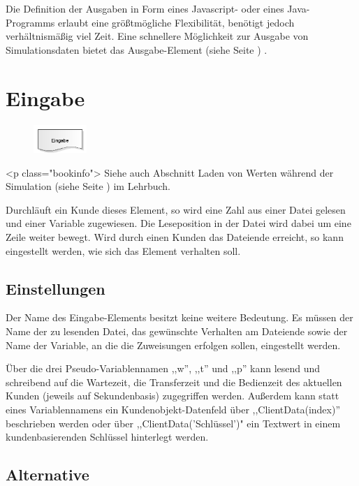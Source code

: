 Die Definition der Ausgaben in Form eines Javascript- oder eines Java-Programms erlaubt eine größtmögliche Flexibilität,
benötigt jedoch verhältnismäßig viel Zeit. Eine schnellere Möglichkeit zur Ausgabe von Simulationsdaten
bietet das Ausgabe-Element (siehe Seite \pageref{ref:ModelElementOutput}) .


\section{Eingabe}
\label{ref:ModelElementInput}

\begin{figure}
\vspace{-22pt}
\includegraphics[width=2cm]{imageModelElementInput.png}
\vspace{-22pt}
\end{figure}

<p class="bookinfo">
Siehe auch Abschnitt Laden von Werten während der Simulation (siehe Seite \pageref{ref:book:9.3.2}) im Lehrbuch.

Durchläuft ein Kunde dieses Element, so wird eine Zahl aus einer Datei gelesen und einer
Variable zugewiesen. Die Leseposition in der Datei wird dabei um eine Zeile weiter bewegt.
Wird durch einen Kunden das Dateiende erreicht, so kann eingestellt werden, wie sich
das Element verhalten soll.

\subsection*{Einstellungen}

Der Name des Eingabe-Elements besitzt keine weitere Bedeutung. Es müssen der Name der zu lesenden
Datei, das gewünschte Verhalten am Dateiende sowie der Name der Variable, an die die Zuweisungen
erfolgen sollen, eingestellt werden.

Über die drei Pseudo-Variablennamen ,,w'', ,,t'' und ,,p'' kann lesend und schreibend auf die Wartezeit, die Transferzeit
und die Bedienzeit des aktuellen Kunden (jeweils auf Sekundenbasis) zugegriffen werden. Außerdem kann statt eines
Variablennamens ein Kundenobjekt-Datenfeld über ,,ClientData(index)'' beschrieben werden oder über ,,ClientData('Schlüssel')"
ein Textwert in einem kundenbasierenden Schlüssel hinterlegt werden.

\subsection*{Alternative}

